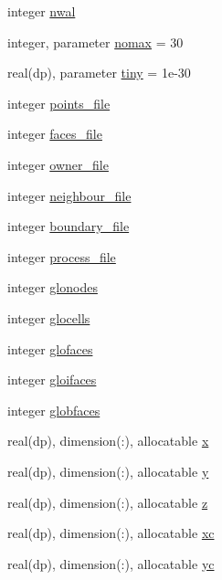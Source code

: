 \begin{DoxyCompactItemize}
\item 
integer \hyperlink{classgeometry_a3e083890c7aae9c07961696766208796}{nwal}
\item 
integer, parameter \hyperlink{classgeometry_aebf6156cf92933802643ed6612d80bcc}{nomax} = 30
\item 
real(dp), parameter \hyperlink{classgeometry_a8f9a710dae624d649ba6196d6a3ad819}{tiny} = 1e-\/30
\item 
integer \hyperlink{classgeometry_a4f9606dd6dec8a18282daf3096cd7074}{points\-\_\-file}
\item 
integer \hyperlink{classgeometry_af70942cfbb3d083b361d7c30d7c7d1b8}{faces\-\_\-file}
\item 
integer \hyperlink{classgeometry_aa4904f087664ad6358d283ca2e053b0f}{owner\-\_\-file}
\item 
integer \hyperlink{classgeometry_a76fd3a715a134c4e338b1bef0d53563b}{neighbour\-\_\-file}
\item 
integer \hyperlink{classgeometry_a7b1e102e0a1a96f15dcd1def8d7e0e28}{boundary\-\_\-file}
\item 
integer \hyperlink{classgeometry_a6d6c8b4ed2fdb31e8b906eccb7fe8bd2}{process\-\_\-file}
\item 
integer \hyperlink{classgeometry_aa32cd7bcc888322cd384ba928fbe0fd8}{glonodes}
\item 
integer \hyperlink{classgeometry_a0512cb49b2ee4ae8aa67fe7b3e9cfa25}{glocells}
\item 
integer \hyperlink{classgeometry_a11e0bee8bca796dfc9673a1652675d95}{glofaces}
\item 
integer \hyperlink{classgeometry_aa0b3019664f1e20f95c082706fbf4bf6}{gloifaces}
\item 
integer \hyperlink{classgeometry_ad1e038213bb054d1e90870329c685f60}{globfaces}
\item 
real(dp), dimension(\-:), allocatable \hyperlink{classgeometry_addb7458352afb3060d5831f54b39ca61}{x}
\item 
real(dp), dimension(\-:), allocatable \hyperlink{classgeometry_a12fdb27cf84ec561b9c20625748e8f57}{y}
\item 
real(dp), dimension(\-:), allocatable \hyperlink{classgeometry_a567da85e335951f534f57b51765df56a}{z}
\item 
real(dp), dimension(\-:), allocatable \hyperlink{classgeometry_ab8a1629eea878ff62c7dbd6b6025fc55}{xc}
\item 
real(dp), dimension(\-:), allocatable \hyperlink{classgeometry_a23fc04ce2affc5bb7f3b1f3464feab40}{yc}
\item 

\end{DoxyCompactItemize}
